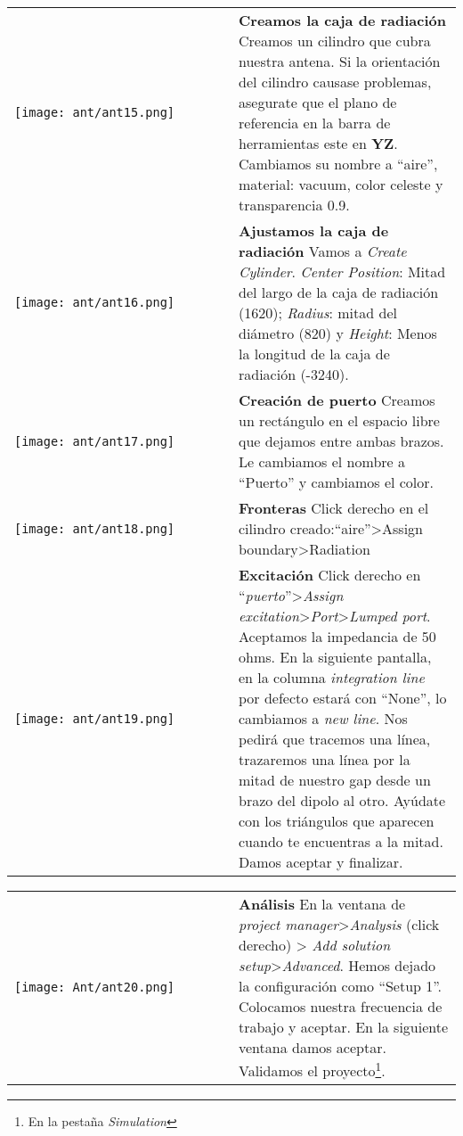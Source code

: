 \documentclass[
	12pt, %
	fleqn, %
	a4paper, %
	oneside, %
]{LegrandOrangeBook}
\begin{document}
\begin{tabular}{k{0.5\linewidth}  j{0.5\linewidth}}
        \texttt{[image: ant/ant15.png]} & \textbf{Creamos la caja de radiación} \newline 
        Creamos un cilindro que cubra nuestra antena. Si la orientación del cilindro causase problemas, asegurate que el plano de referencia en la barra de herramientas este en \textbf{YZ}. Cambiamos su nombre a ``aire'', material: vacuum, color celeste y transparencia 0.9.\\
        \texttt{[image: ant/ant16.png]} & \textbf{Ajustamos la caja de radiación} \newline 
        Vamos a \textit{Create Cylinder}. \textit{Center Position}: Mitad del largo de la caja de radiación (1620); \textit{Radius}: mitad del diámetro (820) y \textit{Height}: Menos la longitud de la caja de radiación (-3240).\\
         \texttt{[image: ant/ant17.png]} & \textbf{Creación de puerto} \newline 
        Creamos un rectángulo en el espacio libre que dejamos entre ambas brazos. Le cambiamos el nombre a ``Puerto'' y cambiamos el color.\\
        \texttt{[image: ant/ant18.png]} & \textbf{Fronteras} \newline 
        Click derecho en el cilindro creado:``aire''>Assign boundary>Radiation\\
        \texttt{[image: ant/ant19.png]} & \textbf{Excitación} \newline 
        Click derecho en ``\textit{puerto}''>\textit{Assign excitation}>\textit{Port}>\textit{Lumped port}. Aceptamos la impedancia de 50 ohms. En la siguiente pantalla, en la columna \textit{integration line} por defecto estará con ``None'', lo cambiamos a \textit{new line}. Nos pedirá que tracemos una línea, trazaremos una línea por la mitad de nuestro gap desde un brazo del dipolo al otro. Ayúdate con los triángulos que aparecen cuando te encuentras a la mitad. Damos aceptar y finalizar.\\
\end{tabular}
\begin{tabular}{k{0.5\linewidth}  j{0.5\linewidth}}
        \texttt{[image: Ant/ant20.png]} & \textbf{Análisis} \newline 
        En la ventana de \textit{project manager}>\textit{Analysis} (click derecho) >\textit{ Add solution setup}>\textit{Advanced}. Hemos dejado la configuración como ``Setup 1''. Colocamos nuestra frecuencia de trabajo y aceptar. En la siguiente ventana damos aceptar. Validamos el proyecto\footnote{En la pestaña \textit{Simulation}}.
\end{tabular}
\end{document}
